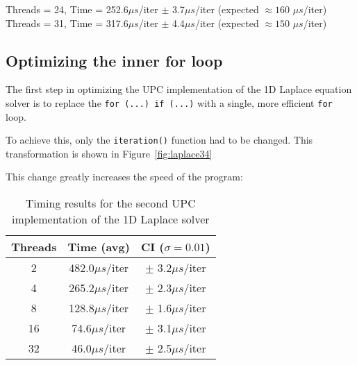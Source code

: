\documentclass[12pt]{article}
\newcommand{\us}[0]{${\mu}s$}
\begin{document}
\begin{center}
  Threads = 24, \quad Time = 252.6\us/iter $\pm$ 3.7\us/iter \enspace (expected $\approx 160$ \us/iter) \\
  Threads = 31, \quad Time = 317.6\us/iter $\pm$ 4.4\us/iter \enspace (expected $\approx 150$ \us/iter)
\end{center}



\subsection{Optimizing the inner for loop}

The first step in optimizing the UPC implementation of the 1D Laplace equation solver is to replace the \texttt{for (...) if (...)} with a single, more efficient \texttt{for} loop.

To achieve this, only the \texttt{iteration()} function had to be changed.
This transformation is shown in Figure~\ref{fig:laplace34}

This change greatly increases the speed of the program:

\begin{table}[ht]
  \centering\begin{tabular}{|c|c|c|}
    \hline
    Threads & Time (avg) & CI ($\sigma=0.01$) \\
    \hline
    2 & 482.0\us/iter & $\pm$ 3.2\us/iter \\
    4 & 265.2\us/iter & $\pm$ 2.3\us/iter \\
    8 & 128.8\us/iter & $\pm$ 1.6\us/iter \\
    16 & 74.6\us/iter & $\pm$ 3.1\us/iter \\
    32 & 46.0\us/iter & $\pm$ 2.5\us/iter \\
    \hline
  \end{tabular}
  \caption{Timing results for the second UPC implementation of the 1D Laplace solver}
  \label{tab:laplace4}
\end{table}
\end{document}
